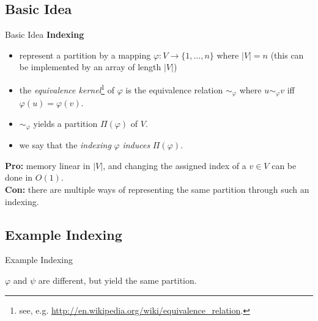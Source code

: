 \documentclass[10pt]{beamer}
\newcommand{\idx}{\varphi}
\newcommand{\varidx}{\psi}
\begin{document}
\subsection*{Basic Idea}
\begin{frame}{Basic Idea}
    \textbf{Indexing}
    \begin{itemize}
        \item represent a partition by a mapping $\idx: V \rightarrow \{ 1,\dots, n \}$ where $|V| = n$ (this can be implemented by an array of length $|V|$)
        \item the \emph{equivalence kernel}\footnote{see, e.g. \url{http://en.wikipedia.org/wiki/equivalence_relation}.} of $\idx$ is the equivalence relation $\sim_\idx$ where $u \sim_\idx v$ iff $\idx(u) = \idx(v)$.
        \item $\sim_\idx$ yields a partition $\Pi(\idx)$ of $V$.
        \item we say that the \emph{indexing} $\idx$ \emph{induces} $\Pi(\idx)$.
    \end{itemize}
    \pause
    \textbf{Pro:} memory linear in $|V|$, and changing the assigned index of a $v \in V$ can be done in $O(1)$. \\
    \textbf{Con:} there are multiple ways of representing the same partition through such an indexing.
\end{frame}

\subsection*{Example Indexing}
\begin{frame}{Example Indexing}
    \begin{figure}
    \end{figure}
    $\idx$ and $\varidx$ are different, but yield the same partition.
\end{frame}
\end{document}
